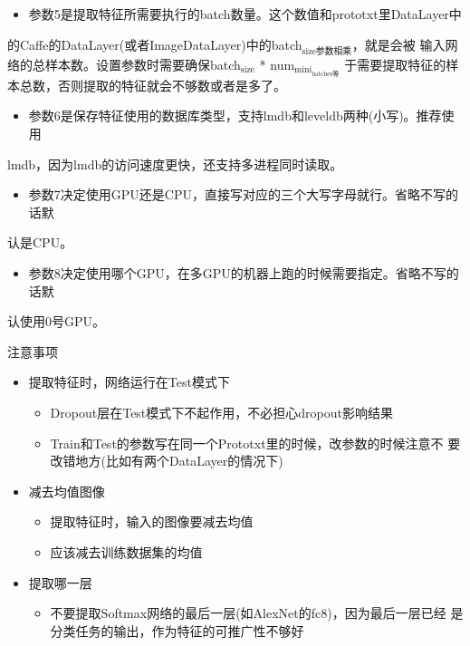 \documentclass[11pt]{article}
\begin{document}
\begin{itemize}
\item 参数5是提取特征所需要执行的batch数量。这个数值和prototxt里DataLayer中
\end{itemize}
的Caffe的DataLayer(或者ImageDataLayer)中的batch\(_{\text{size参数相乘}}\)，就是会被
输入网络的总样本数。设置参数时需要确保batch\(_{\text{size}}\) * num\(_{\text{mini}}_{\text{batches等}}\)
于需要提取特征的样本总数，否则提取的特征就会不够数或者是多了。 

\begin{itemize}
\item 参数6是保存特征使用的数据库类型，支持lmdb和leveldb两种(小写)。推荐使用
\end{itemize}
lmdb，因为lmdb的访问速度更快，还支持多进程同时读取。 

\begin{itemize}
\item 参数7决定使用GPU还是CPU，直接写对应的三个大写字母就行。省略不写的话默
\end{itemize}
认是CPU。 

\begin{itemize}
\item 参数8决定使用哪个GPU，在多GPU的机器上跑的时候需要指定。省略不写的话默
\end{itemize}
认使用0号GPU。 

注意事项
\begin{itemize}
\item 提取特征时，网络运行在Test模式下
\begin{itemize}
\item Dropout层在Test模式下不起作用，不必担心dropout影响结果
\item Train和Test的参数写在同一个Prototxt里的时候，改参数的时候注意不
要改错地方(比如有两个DataLayer的情况下)
\end{itemize}
\item 减去均值图像
\begin{itemize}
\item 提取特征时，输入的图像要减去均值
\item 应该减去训练数据集的均值
\end{itemize}
\item 提取哪一层
\begin{itemize}
\item 不要提取Softmax网络的最后一层(如AlexNet的fc8)，因为最后一层已经
是分类任务的输出，作为特征的可推广性不够好
\end{itemize}
\end{itemize}
\end{document}
